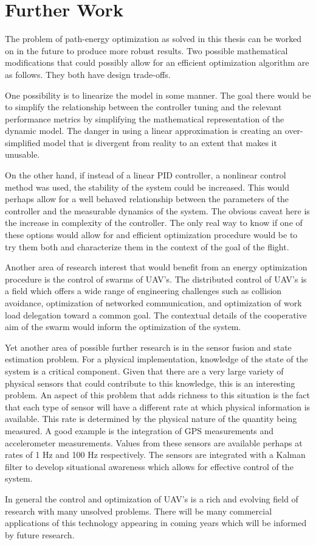 \section{Further Work}

The problem of path-energy optimization as solved in this thesis can be worked on in the future to produce more robust results. Two possible mathematical modifications that could possibly allow for an efficient optimization algorithm are as follows. They both have design trade-offs. 

One possibility is to linearize the model in some manner. The goal there would be to simplify the relationship between the controller tuning and the relevant performance metrics by simplifying the mathematical representation of the dynamic model. The danger in using a linear approximation is creating an over-simplified model that is divergent from reality to an extent that makes it unusable. 

On the other hand, if instead of a linear PID controller, a nonlinear control method was used, the stability of the system could be increased. This would perhaps allow for a well behaved relationship between the parameters of the controller and the measurable dynamics of the system. The obvious caveat  here is the increase in complexity of the controller. The only real way to know if one of these options would allow for and efficient optimization procedure would be to try them both and characterize them in the context of the goal of the flight.

Another area of research interest that would benefit from an energy optimization procedure is the control of swarms of UAV's. The distributed control of UAV's is a field which offers a wide range of engineering challenges such as collision avoidance, optimization of networked communication, and optimization of work load delegation toward a common goal. The contextual details of the cooperative aim of the swarm would inform the optimization of the system.

        
Yet another area of possible further research is in the sensor fusion and state estimation problem. For a physical implementation, knowledge of the state of the system is a critical component. Given that there are a very large variety of physical sensors that could contribute to this knowledge, this is an interesting problem. An aspect of this problem that adds richness to this situation is the fact that each type of sensor will have a different rate at which physical information is available. This rate is determined by the physical nature of the quantity being measured. A good example is the integration of GPS measurements and accelerometer measurements. Values from these sensors are available perhaps at rates of 1 Hz and 100 Hz respectively. The sensors are integrated with a Kalman filter to develop situational awareness which allows for effective control of the system.

In general the control and optimization of UAV's is a rich and evolving field of research with many unsolved problems. There will be many commercial applications of this technology appearing in coming years which will be informed by future research.






   



         
